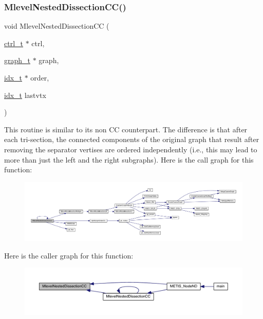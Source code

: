\subsubsection{\texorpdfstring{Mlevel\+Nested\+Dissection\+C\+C()}{MlevelNestedDissectionCC()}}
{\footnotesize\ttfamily void Mlevel\+Nested\+Dissection\+CC (\begin{DoxyParamCaption}\item[{\hyperlink{a00742}{ctrl\+\_\+t} $\ast$}]{ctrl,  }\item[{\hyperlink{a00734}{graph\+\_\+t} $\ast$}]{graph,  }\item[{\hyperlink{a00876_aaa5262be3e700770163401acb0150f52}{idx\+\_\+t} $\ast$}]{order,  }\item[{\hyperlink{a00876_aaa5262be3e700770163401acb0150f52}{idx\+\_\+t}}]{lastvtx }\end{DoxyParamCaption})}

This routine is similar to its non \textquotesingle{}CC\textquotesingle{} counterpart. The difference is that after each tri-\/section, the connected components of the original graph that result after removing the separator vertises are ordered independently (i.\+e., this may lead to more than just the left and the right subgraphs). Here is the call graph for this function\+:\nopagebreak
\begin{figure}[H]
\begin{center}
\leavevmode
\includegraphics[width=350pt]{a00933_a3ef15d1ffff55a81b8486bee09239073_cgraph}
\end{center}
\end{figure}
Here is the caller graph for this function\+:\nopagebreak
\begin{figure}[H]
\begin{center}
\leavevmode
\includegraphics[width=350pt]{a00933_a3ef15d1ffff55a81b8486bee09239073_icgraph}
\end{center}
\end{figure}
\mbox{\label{a00933_aeeaa7f4ed9878ae2f7faff0e2402fd87}} 
